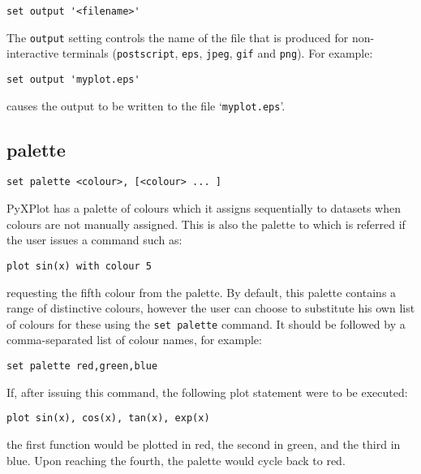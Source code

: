 \begin{verbatim}
set output '<filename>'
\end{verbatim}

The {\tt output} setting controls the name of the file that is produced for
non-interactive terminals ({\tt postscript}, {\tt eps}, {\tt jpeg}, {\tt gif}
and {\tt png}).  For example:

\begin{verbatim}
set output 'myplot.eps'
\end{verbatim}

\noindent causes the output to be written to the file `{\tt myplot.eps}'.


\subsection{palette}

\begin{verbatim}
set palette <colour>, [<colour> ... ]
\end{verbatim}

PyXPlot has a palette of colours which it assigns sequentially to datasets when
colours are not manually assigned. This is also the palette to which is
referred if the user issues a command such as:

\begin{verbatim}
plot sin(x) with colour 5
\end{verbatim}

\noindent requesting the fifth colour from the palette. By default, this palette contains
a range of distinctive colours, however the user can choose to substitute his
own list of colours for these using the {\tt set palette} command. It should be
followed by a comma-separated list of colour names, for example:

\begin{verbatim}
set palette red,green,blue
\end{verbatim}

If, after issuing this command, the following plot statement were to be
executed:

\begin{verbatim}
plot sin(x), cos(x), tan(x), exp(x)
\end{verbatim}

\noindent the first function would be plotted in red, the second in green, and the third
in blue. Upon reaching the fourth, the palette would cycle back to red.

